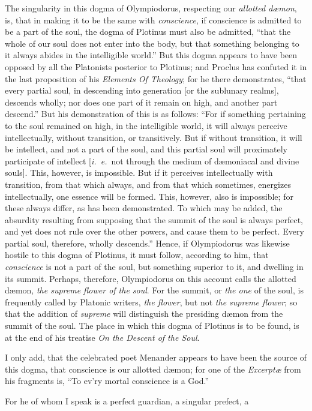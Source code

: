 \documentclass[twoside]{article}
\begin{document}
{The singularity in this dogma of Olympiodorus, respecting our \textit{allotted
d{\ae}mon}, is, that in making it to be the same with \textit{conscience}, if
conscience is admitted to be a part of the soul, the dogma of Plotinus must
also be admitted, ``that the whole of our soul does not enter into the body,
but that something belonging to it always abides in the intelligible world.''
But this dogma appears to have been opposed by all the Platonists posterior to
Plotinus; and Proclus has confuted it in the last proposition of his
\textit{Elements Of Theology}; for he there demonstrates, ``that every partial
soul, in descending into generation [or the sublunary realms], descends wholly;
nor does one part of it remain on high, and another part descend.'' But his
demonstration of this is as follows: ``For if something pertaining to the soul
remained on high, in the intelligible world, it will always perceive
intellectually, without transition, or transitively. But if without transition,
it will be intellect, and not a part of the soul, and this partial soul will
proximately participate of intellect [\textit{i.~e.}~not through the medium of
d{\ae}moniacal and divine souls]. This, however, is impossible. But if it
perceives intellectually with transition, from that which always, and from that
which sometimes, energizes intellectually, one essence will be formed. This,
however, also is impossible; for these always differ, as has been demonstrated.
To which may be added, the absurdity resulting from supposing that the summit
of the soul is always perfect, and yet does not rule over the other powers, and
cause them to be perfect. Every partial soul, therefore, wholly descends.''
Hence, if Olympiodorus was likewise hostile to this dogma of Plotinus, it must
follow, according to him, that \textit{conscience} is not a part of the soul,
but something superior to it, and dwelling in its summit. Perhaps, therefore,
Olympiodorus on this account calls the allotted d{\ae}mon, \textit{the supreme
flower of the soul}. For the summit, or \textit{the one} of the soul, is
frequently called by Platonic writers, \textit{the flower}, but not \textit{the
supreme flower}; so that the addition of \textit{supreme} will distinguish the
presiding d{\ae}mon from the summit of the soul. The place in which this dogma
of Plotinus is to be found, is at the end of his treatise \textit{On the
Descent of the Soul}.

I only add, that the celebrated poet Menander appears to have been the source
of this dogma, that conscience is our allotted d{\ae}mon; for one of the
\textit{Excerpt{\ae}} from his fragments is, ``To ev'ry mortal conscience is a
God.''} For he of whom I speak is a perfect guardian, a singular prefect, a
\end{document}
